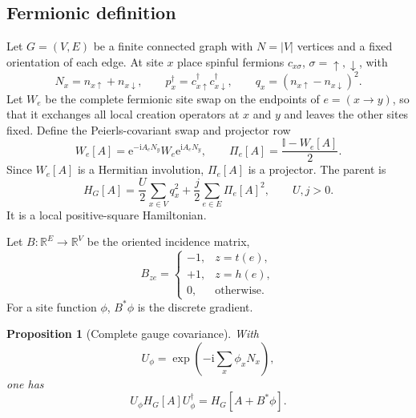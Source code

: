\documentclass[11pt]{article}
\newtheorem{proposition}[theorem]{Proposition}
\theoremstyle{definition}
\theoremstyle{remark}
\newcommand{\Id}{\mathbb I}
\newcommand{\I}{\mathrm i}
\newcommand{\e}{\mathrm e}
\newcommand{\abs}[1]{\lvert #1\rvert}
\begin{document}
\subsection{Fermionic definition}

Let $G=(V,E)$ be a finite connected graph with $N=\abs V$ vertices and a fixed orientation of each edge.
At site $x$ place spinful fermions $c_{x\sigma}$, $\sigma=\uparrow,\downarrow$, with
\begin{equation}
 N_x=n_{x\uparrow}+n_{x\downarrow},
 \qquad
 p_x^\dagger=c_{x\uparrow}^\dagger c_{x\downarrow}^\dagger,
 \qquad
 q_x=(n_{x\uparrow}-n_{x\downarrow})^2.
\end{equation}
Let $W_e$ be the complete fermionic site swap on the endpoints of $e=(x\to y)$, so that it exchanges all
local creation operators at $x$ and $y$ and leaves the other sites fixed.  Define the Peierls-covariant swap
and projector row
\begin{equation}
 W_e[A]
 =\e^{-\I A_eN_y}W_e\e^{\I A_eN_y},
 \qquad
 \Pi_e[A]=\frac{\Id-W_e[A]}2.
 \label{eq:twisted-swap}
\end{equation}
Since $W_e[A]$ is a Hermitian involution, $\Pi_e[A]$ is a projector.  The parent is
\begin{equation}
 \boxed{
 H_G[A]
 =\frac U2\sum_{x\in V}q_x^2
 +\frac j2\sum_{e\in E}\Pi_e[A]^2,
 \qquad U,j>0.}
 \label{eq:swap-parent}
\end{equation}
It is a local positive-square Hamiltonian.

Let $B:\mathbb R^E\to\mathbb R^V$ be the oriented incidence matrix,
\begin{equation}
 B_{z e}=\begin{cases}
 -1,&z=t(e),\\
 +1,&z=h(e),\\
 0,&\text{otherwise}.
 \end{cases}
 \label{eq:incidence}
\end{equation}
For a site function $\phi$, $B^*\phi$ is the discrete gradient.

\begin{proposition}[Complete gauge covariance]
\label{prop:gauge-covariance}
With
\begin{equation}
 U_\phi=\exp\!\left(-\I\sum_x\phi_xN_x\right),
\end{equation}
one has
\begin{equation}
 U_\phi H_G[A]U_\phi^\dagger=H_G[A+B^*\phi].
 \label{eq:graph-gauge}
\end{equation}
\end{proposition}
\end{document}
